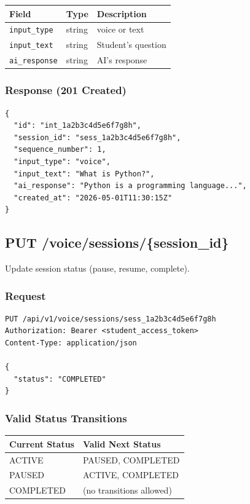 \documentclass[12pt,a4paper,oneside]{article}
\begin{document}
\begin{table}[H]
\centering
\small
\begin{tabular}{|l|l|l|}
\hline
\textbf{Field} & \textbf{Type} & \textbf{Description} \\
\hline
\texttt{input\_type} & string & voice or text \\
\hline
\texttt{input\_text} & string & Student's question \\
\hline
\texttt{ai\_response} & string & AI's response \\
\hline
\end{tabular}
\end{table}

\subsubsection{Response (201 Created)}

\begin{lstlisting}
{
  "id": "int_1a2b3c4d5e6f7g8h",
  "session_id": "sess_1a2b3c4d5e6f7g8h",
  "sequence_number": 1,
  "input_type": "voice",
  "input_text": "What is Python?",
  "ai_response": "Python is a programming language...",
  "created_at": "2026-05-01T11:30:15Z"
}
\end{lstlisting}

\subsection{PUT /voice/sessions/\{session\_id\}}

Update session status (pause, resume, complete).

\subsubsection{Request}

\begin{lstlisting}
PUT /api/v1/voice/sessions/sess_1a2b3c4d5e6f7g8h
Authorization: Bearer <student_access_token>
Content-Type: application/json

{
  "status": "COMPLETED"
}
\end{lstlisting}

\subsubsection{Valid Status Transitions}

\begin{table}[H]
\centering
\small
\begin{tabular}{|l|l|}
\hline
\textbf{Current Status} & \textbf{Valid Next Status} \\
\hline
ACTIVE & PAUSED, COMPLETED \\
\hline
PAUSED & ACTIVE, COMPLETED \\
\hline
COMPLETED & (no transitions allowed) \\
\hline
\end{tabular}
\end{table}
\end{document}
